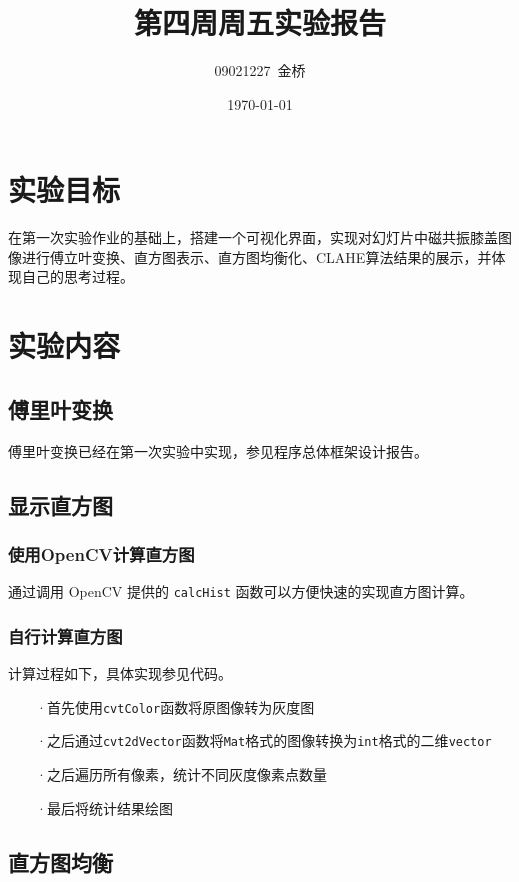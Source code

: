 \documentclass{article}
\title{第四周周五实验报告}
\author{09021227~金桥}
\date{\today}
\begin{document}
\maketitle

\section{实验目标}

在第一次实验作业的基础上，搭建一个可视化界面，实现对幻灯片中磁共振膝盖图像进行傅立叶变换、直方图表示、直方图均衡化、CLAHE算法结果的展示，并体现自己的思考过程。

\section{实验内容}

\subsection{傅里叶变换}

傅里叶变换已经在第一次实验中实现，参见程序总体框架设计报告。

\subsection{显示直方图}

\subsubsection{使用OpenCV计算直方图}

通过调用 OpenCV 提供的 \texttt{calcHist} 函数可以方便快速的实现直方图计算。

\subsubsection{自行计算直方图}

计算过程如下，具体实现参见代码。

~~~~·首先使用\texttt{cvtColor}函数将原图像转为灰度图

~~~~·之后通过\texttt{cvt2dVector}函数将\texttt{Mat}格式的图像转换为\texttt{int}格式的二维\texttt{vector}

~~~~·之后遍历所有像素，统计不同灰度像素点数量

~~~~·最后将统计结果绘图

\subsection{直方图均衡}
\end{document}
